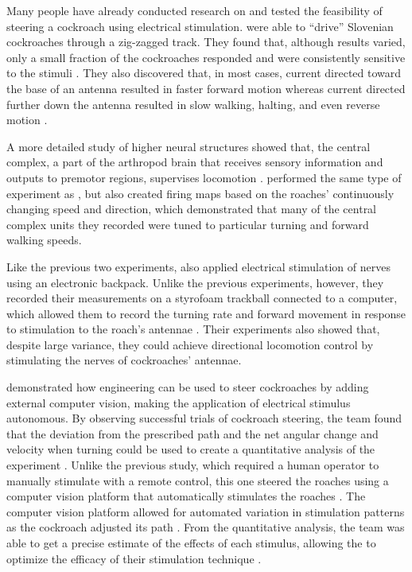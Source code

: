 Many people have already conducted research on and tested the feasibility of steering a cockroach using electrical stimulation. \citet{moore1998directed} were able to ``drive'' Slovenian cockroaches through a zig-zagged track. They found that, although results varied, only a small fraction of the cockroaches responded and were consistently sensitive to the stimuli \citep{moore1998directed}. They also discovered that, in most cases, current directed toward the base of an antenna resulted in faster forward motion whereas current directed further down the antenna resulted in slow walking, halting, and even reverse motion \citep{moore1998directed}.

A more detailed study of higher neural structures showed that, the central complex, a part of the arthropod brain that receives sensory information and outputs to premotor regions, supervises locomotion \citep{guo2013neural}. \citet{guo2013neural} performed the same type of experiment as \citet{moore1998directed}, but also created firing maps based on the roaches' continuously changing speed and direction, which demonstrated that many of the central complex units they recorded were tuned to particular turning and forward walking speeds.

Like the previous two experiments, \citet{holzer1997locomotion} also applied electrical stimulation of nerves using an electronic backpack. Unlike the previous experiments, however, they recorded their measurements on a styrofoam trackball connected to a computer, which allowed them to record the turning rate and forward movement in response to stimulation to the roach's antennae \citep{holzer1997locomotion}. Their experiments also showed that, despite large variance, they could achieve directional locomotion control by stimulating the nerves of cockroaches' antennae.

\citet{whitmire2013kinect} demonstrated how engineering can be used to steer cockroaches by adding external computer vision, making the application of electrical stimulus autonomous. By observing successful trials of cockroach steering, the team found that the deviation from the prescribed path and the net angular change and velocity when turning could be used to create a quantitative analysis of the experiment \citep{whitmire2013kinect}. Unlike the previous study, which required a human operator to manually stimulate with a remote control, this one steered the roaches using a computer vision platform that automatically stimulates the roaches \citep{whitmire2013kinect}. The computer vision platform allowed for automated variation in stimulation patterns as the cockroach adjusted its path \citep{whitmire2013kinect}. From the quantitative analysis, the team was able to get a precise estimate of the effects of each stimulus, allowing the to optimize the efficacy of their stimulation technique \citep{whitmire2013kinect}. 





